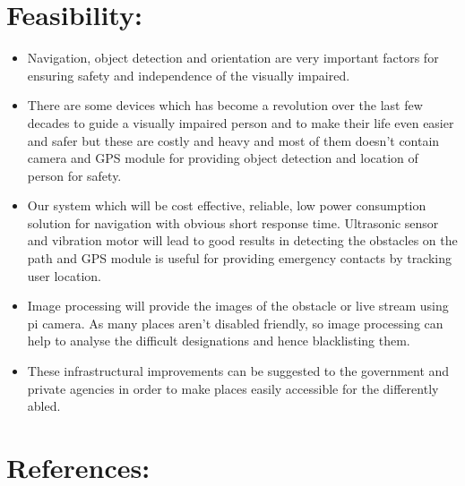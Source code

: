 \section{Feasibility:}
\begin{itemize}
   \item Navigation, object detection and orientation are very important factors for ensuring safety and independence of the visually impaired.
   
   \item There are some devices which has become a revolution over the last few decades to guide a visually impaired person and to make their life even easier and safer but these are costly and heavy and most of them doesn’t contain camera and GPS module for providing object detection and location of person for safety.

   \item
   Our system which will be cost effective, reliable, low power consumption solution for navigation with obvious short response time. Ultrasonic sensor and vibration motor will lead to good results in detecting the obstacles on the path and GPS module is useful for providing emergency contacts by tracking user location.
   
   \item Image processing will provide  the images of the obstacle or live stream using pi camera. As many places aren’t disabled friendly, so image processing can help to analyse the difficult designations and hence blacklisting them. 

   \item These infrastructural improvements can be suggested to the government and private agencies in order to make places easily accessible for the differently abled.
\end{itemize}

\section{References:}

